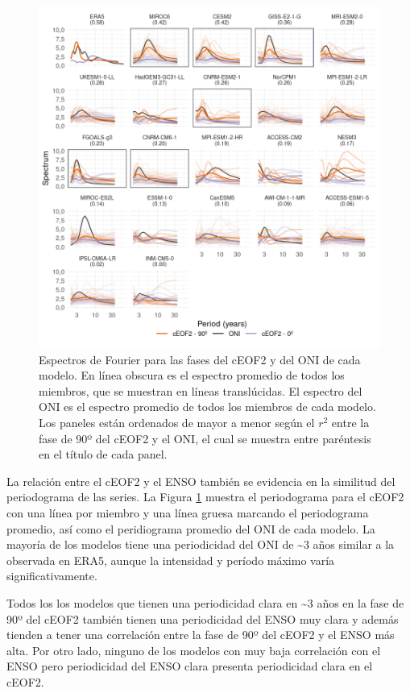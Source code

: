 \documentclass[12pt,oneside,a4paper]{reedthesis}
\begin{document}
\begin{figure}

{\centering \includegraphics{figures/50-cmip6/fft-ceof2-1} 

}

\caption{Espectros de Fourier para las fases del cEOF2 y del ONI de cada modelo. En línea obscura es el espectro promedio de todos los miembros, que se muestran en líneas translúcidas. El espectro del ONI es el espectro promedio de todos los miembros de cada modelo. Los paneles están ordenados de mayor a menor según el \(r^2\) entre la fase de 90º del cEOF2 y el ONI, el cual se muestra entre paréntesis en el título de cada panel.}\label{fig:fft-ceof2}
\end{figure}



La relación entre el cEOF2 y el ENSO también se evidencia en la similitud del periodograma de las series.
La Figura \ref{fig:fft-ceof2} muestra el periodograma para el cEOF2 con una línea por miembro y una línea gruesa marcando el periodograma promedio, así como el peridiograma promedio del ONI de cada modelo.
La mayoría de los modelos tiene una periodicidad del ONI de \textasciitilde3 años similar a la observada en ERA5, aunque la intensidad y período máximo varía significativamente.

Todos los los modelos que tienen una periodicidad clara en \textasciitilde3 años en la fase de 90º del cEOF2 también tienen una periodicidad del ENSO muy clara y además tienden a tener una correlación entre la fase de 90º del cEOF2 y el ENSO más alta.
Por otro lado, ninguno de los modelos con muy baja correlación con el ENSO pero periodicidad del ENSO clara presenta periodicidad clara en el cEOF2.
\end{document}
